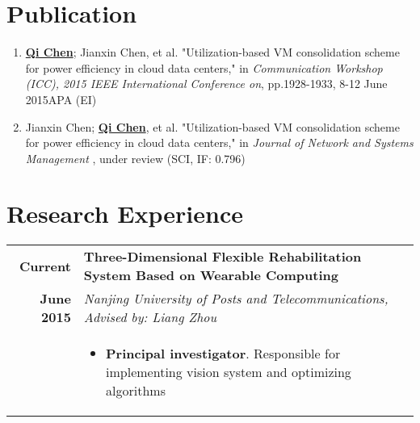 \documentclass[a4paper, 10pt]{extarticle} %
\begin{document}
\begin{CJK*}{GBK}{song}
\section{Publication}

\begin{enumerate}[]

\item \underline{\textbf{Qi Chen}}; Jianxin Chen, et al. "Utilization-based VM consolidation scheme for power efficiency in cloud data centers," in \emph{Communication Workshop (ICC), 2015 IEEE International Conference on}, pp.1928-1933, 8-12 June 2015APA (EI)
\item Jianxin Chen; \underline{\textbf{Qi Chen}}, et al. "Utilization-based VM consolidation scheme for power efficiency in cloud data centers," in \emph{Journal of Network and Systems Management} , under review (SCI, IF: 0.796)
\end{enumerate}



\section{Research Experience}

\begin{longtable}{r | p{15cm}}

			\textbf{Current}
		
		 &
		
		 \textbf{Three-Dimensional Flexible Rehabilitation System Based on Wearable Computing}  \\
		
			\textbf{June 2015}
		&
		
		\footnotesize{

\vspace{-0.3cm}\textit{Nanjing University of Posts and Telecommunications, Advised by: Liang Zhou}}
 \\
		
&

\footnotesize{

\vspace{-0.3cm}


\begin{itemize}[leftmargin=*]
\item \textbf{Principal investigator}. Responsible for implementing vision system and optimizing algorithms


\end{itemize}}
\end{longtable}
\end{CJK*}
\end{document}
